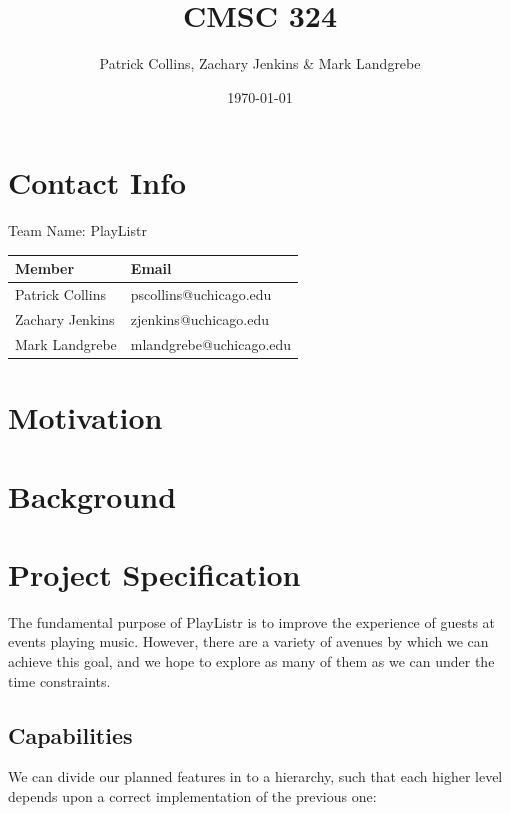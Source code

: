 \documentclass[12pt]{article}
\begin{document}
\title{CMSC 324}
\author{Patrick Collins, Zachary Jenkins \& Mark Landgrebe}
\date{\today}
\maketitle
\pagebreak

\section{Contact Info}
Team Name: PlayListr

\begin{center}
\begin{tabular}{l|l}
 Member           &  Email                    \\ \hline
 Patrick Collins  &  pscollins@uchicago.edu   \\
 Zachary Jenkins  &  zjenkins@uchicago.edu    \\
 Mark Landgrebe   &  mlandgrebe@uchicago.edu  \\
\end{tabular}
\end{center}

\pagebreak

\section{Motivation}

\pagebreak
\section{Background}

\pagebreak

\section{Project Specification}
The fundamental purpose of PlayListr is to improve the experience of
guests at events playing music. However, there are a variety of
avenues by which we can achieve this goal, and we hope to explore as
many of them as we can under the time constraints.

\subsection{Capabilities}
We can divide our planned features in to a hierarchy, such that each
higher level depends upon a correct implementation of the previous
one:
\end{document}
